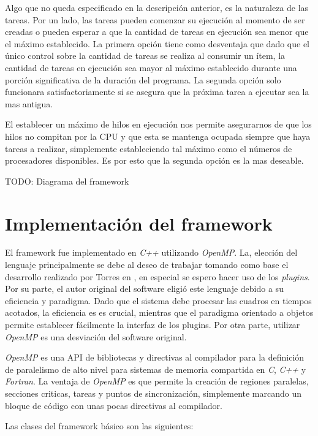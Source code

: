 Algo que no queda especificado en la descripción anterior, es la naturaleza de
las tareas. Por un lado, las tareas pueden comenzar su ejecución al momento de
ser creadas o pueden esperar a que la cantidad de tareas en ejecución sea menor
que el máximo establecido. La primera opción tiene como desventaja que dado que
el único control sobre la cantidad de tareas se realiza al consumir un ítem, la
cantidad de tareas en ejecución sea mayor al máximo establecido durante una
porción significativa de la duración del programa. La segunda opción solo
funcionara satisfactoriamente si se asegura que la próxima tarea a ejecutar sea
la mas antigua.

El establecer un máximo de hilos en ejecución nos permite asegurarnos de que los
hilos no compitan por la CPU y que esta se mantenga ocupada siempre que haya
tareas a realizar, simplemente estableciendo tal máximo como el números de
procesadores disponibles. Es por esto que la segunda opción es la mas deseable.

TODO: Diagrama del framework

\section{Implementación del framework}

El framework fue implementado en \emph{C++} utilizando \emph{OpenMP}. La,
elección del lenguaje principalmente se debe al deseo de trabajar tomando como
base el desarrollo realizado por Torres en \cite{torres2014}, en especial se
espero hacer uso de los \emph{plugins}. Por su parte, el autor original del
software eligió este lenguaje debido a su eficiencia y paradigma. Dado que el
sistema debe procesar las cuadros en tiempos acotados, la eficiencia es es
crucial, mientras que el paradigma orientado a objetos permite establecer
fácilmente la interfaz de los plugins. Por otra parte, utilizar \emph{OpenMP} es
una desviación del software original.

\emph{OpenMP} es una API de bibliotecas y directivas al compilador para la
definición de paralelismo de alto nivel para sistemas de memoria compartida en
\emph{C}, \emph{C++} y \emph{Fortran}\cite{ompWeb}. La ventaja de \emph{OpenMP}
es que permite la creación de regiones paralelas, secciones criticas, tareas y
puntos de sincronización, simplemente marcando un bloque de código con unas
pocas directivas al compilador.

Las clases del framework básico son las siguientes:

